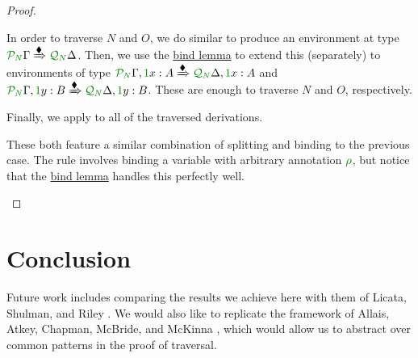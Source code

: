 \documentclass[submission,copyright,creativecommons]{eptcs}
\begin{document}
\begin{proof}
\begin{description}
      In order to traverse $N$ and $O$, we do similar to produce an environment
      at type
      $\ctx{\Gamma}{P_{\mathnormal N}}
      \subst{\kitrel} \ctx{\Delta}{Q_{\mathnormal N}}$.
      Then, we use the \hyperref[lem:bind]{bind lemma} to extend this
      (separately) to environments of type
      $\ctx{\Gamma}{P_{\mathnormal N}}, \ctxvar{x}{A}{1}
      \subst{\kitrel} \ctx{\Delta}{Q_{\mathnormal N}}, \ctxvar{x}{A}{1}$ and
      $\ctx{\Gamma}{P_{\mathnormal N}}, \ctxvar{y}{B}{1}
      \subst{\kitrel} \ctx{\Delta}{Q_{\mathnormal N}}, \ctxvar{y}{B}{1}$.
      These are enough to traverse $N$ and $O$, respectively.

      Finally, we apply  to all of the traversed
      derivations.
    \item[\TirName{$\tensor{}{}$-E}, \TirName{$\excl{\rho}{}$-E}:]
      These both feature a similar combination of splitting and binding to the
      previous case.
      The  rule involves binding a variable with
      arbitrary annotation $\rescomment\rho$, but notice that the
      \hyperref[lem:bind]{bind lemma} handles this perfectly well.
  \end{description}
\end{proof}

\section{Conclusion}\label{sec:conclusion}

Future work includes comparing the results we achieve here with them of Licata,
Shulman, and Riley \cite{LicataSR17}.
We would also like to replicate the framework of Allais, Atkey, Chapman,
McBride, and McKinna \cite{AACMM20}, which would allow us to abstract over common
patterns in the proof of traversal.



\end{document}

